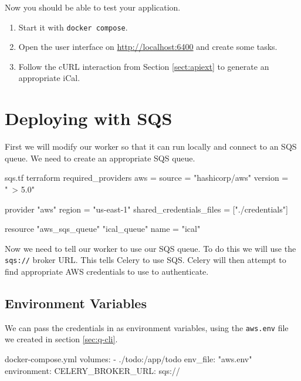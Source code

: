 \documentclass{csse4400}
\begin{document}
Now you should be able to test your application.
\begin{enumerate}
    \item Start it with \texttt{docker compose}.
    \item Open the user interface on \url{http://localhost:6400} and create some tasks.
    \item Follow the cURL interaction from Section \ref{sect:apiext} to generate an appropriate iCal.
\end{enumerate}


\section{Deploying with SQS}

First we will modify our worker so that it can run locally and connect to an SQS queue.
We need to create an appropriate SQS queue.
%
\begin{code}[language=terraform,numbers=none]{sqs.tf}
terraform {
  required_providers {
    aws = {
      source = "hashicorp/aws"
      version = "~> 5.0"
    }
  }
}

provider "aws" {
  region = "us-east-1"
  shared_credentials_files = ["./credentials"]
}

resource "aws_sqs_queue" "ical_queue" {
    name = "ical"
}\end{code}


Now we need to tell our worker to use our SQS queue.
To do this we will use the \texttt{sqs://} broker URL.
This tells Celery to use SQS.
Celery will then attempt to find appropriate AWS credentials to use to authenticate.

\subsection{Environment Variables}

We can pass the credentials in as environment variables,
using the \texttt{aws.env} file we created in section \ref{sec:q-cli}.

\vspace{-1.5em}
\begin{code}[numbers=none]{docker-compose.yml}
    volumes:
      - ./todo:/app/todo
    env_file: "aws.env"
    environment:
      CELERY_BROKER_URL: sqs://
\end{code}
\end{document}

